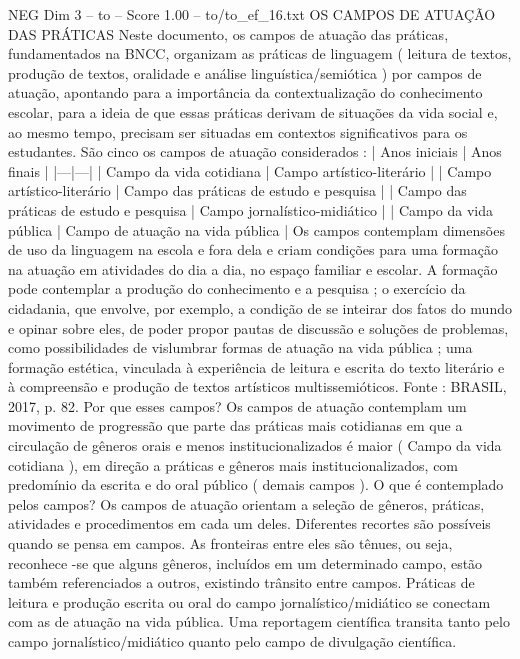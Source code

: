 \begin{textsample}{NEG Dim 3 – to – Score 1.00 – to/to\_ef\_16.txt}  \label{ex:f3_neg_188}
OS CAMPOS DE ATUAÇÃO DAS PRÁTICAS Neste documento, os campos de atuação das práticas, fundamentados na BNCC, organizam as práticas de linguagem ( leitura de textos, produção de textos, oralidade e análise linguística/semiótica ) por campos de atuação, apontando para a importância da contextualização do conhecimento escolar, para a ideia de que essas práticas derivam de situações da vida social e, ao mesmo tempo, precisam ser situadas em contextos significativos para os estudantes.
São cinco os campos de atuação considerados : | Anos iniciais | Anos finais | |---|---| | Campo da vida cotidiana | Campo artístico-literário | | Campo artístico-literário | Campo das práticas de estudo e pesquisa | | Campo das práticas de estudo e pesquisa | Campo jornalístico-midiático | | Campo da vida pública | Campo de atuação na vida pública | Os campos contemplam dimensões de uso da linguagem na escola e fora dela e criam condições para uma formação na atuação em atividades do dia a dia, no espaço familiar e escolar.
A formação pode contemplar a produção do conhecimento e a pesquisa ; o exercício da cidadania, que envolve, por exemplo, a condição de se inteirar dos fatos do mundo e opinar sobre eles, de poder propor pautas de discussão e soluções de problemas, como possibilidades de vislumbrar formas de atuação na vida pública ; uma formação estética, vinculada à experiência de leitura e escrita do texto literário e à compreensão e produção de textos artísticos multissemióticos.
Fonte : BRASIL, 2017, p. 82.
Por que esses campos?
Os campos de atuação contemplam um movimento de progressão que parte das práticas mais cotidianas em que a circulação de gêneros orais e menos institucionalizados é maior ( Campo da vida cotidiana ), em direção a práticas e gêneros mais institucionalizados, com predomínio da escrita e do oral público ( demais campos ).
O que é contemplado pelos campos?
Os campos de atuação orientam a seleção de gêneros, práticas, atividades e procedimentos em cada um deles.
Diferentes recortes são possíveis quando se pensa em campos.
As fronteiras entre eles são tênues, ou seja, reconhece -se que alguns gêneros, incluídos em um determinado campo, estão também referenciados a outros, existindo trânsito entre campos.
Práticas de leitura e produção escrita ou oral do campo jornalístico/midiático se conectam com as de atuação na vida pública.
Uma reportagem científica transita tanto pelo campo jornalístico/midiático quanto pelo campo de divulgação científica.

\end{textsample}
